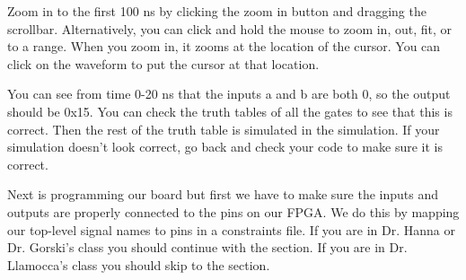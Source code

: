 \begin{center}
\end{center}

Zoom in to the first 100 ns by clicking the zoom in button and dragging the scrollbar.
Alternatively, you can click and hold the mouse to zoom in, out, fit, or to a range.
When you zoom in, it zooms at the location of the cursor.
You can click on the waveform to put the cursor at that location.

\begin{center}
\end{center}

You can see from time 0-20 ns that the inputs a and b are both 0, so the output should be 0x15.
You can check the truth tables of all the gates to see that this is correct.
Then the rest of the truth table is simulated in the simulation.
If your simulation doesn't look correct, go back and check your code to make sure it is correct.

Next is programming our board but first we have to make sure the inputs and outputs are properly
connected to the pins on our FPGA.
We do this by mapping our top-level signal names to pins in a constraints file.
If you are in Dr. Hanna or Dr. Gorski's class you should continue with the
 section.
If you are in Dr. Llamocca's class you should skip to the  section.

